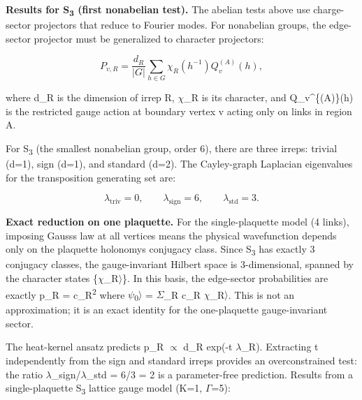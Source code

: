 \textbf{Results for S\textsubscript{3} (first nonabelian test).} The abelian tests above use charge-sector projectors that reduce to Fourier modes. For nonabelian groups, the edge-sector projector must be generalized to character projectors:

\[
P_{v,R} = \frac{d_R}{|G|} \sum_{h \in G} \chi_R(h^{-1}) Q_v^{(A)}(h),
\]

where d\_R is the dimension of irrep R, \ensuremath{\chi}\_R is its character, and Q\_v\^{}\{(A)\}(h) is the restricted gauge action at boundary vertex v acting only on links in region A.

For S\textsubscript{3} (the smallest nonabelian group, order 6), there are three irreps: trivial (d=1), sign (d=1), and standard (d=2). The Cayley-graph Laplacian eigenvalues for the transposition generating set are:

\[
\lambda_{\mathrm{triv}} = 0, \qquad \lambda_{\mathrm{sign}} = 6, \qquad
\lambda_{\mathrm{std}} = 3.
\]

\textbf{Exact reduction on one plaquette.} For the single-plaquette model (4 links), imposing Gauss\textquotesingle s law at all vertices means the physical wavefunction depends only on the plaquette holonomy\textquotesingle s conjugacy class. Since S\textsubscript{3} has exactly 3 conjugacy classes, the gauge-invariant Hilbert space is 3-dimensional, spanned by the character states \{\textbar \ensuremath{\chi}\_R\ensuremath{\rangle}\}. In this basis, the edge-sector probabilities are exactly p\_R = \textbar c\_R\textbar\textsuperscript{2} where \textbar \ensuremath{\psi}\textsubscript{0}\ensuremath{\rangle} = \ensuremath{\Sigma}\_R c\_R \textbar \ensuremath{\chi}\_R\ensuremath{\rangle}. This is not an approximation; it is an exact identity for the one-plaquette gauge-invariant sector.

The heat-kernel ansatz predicts p\_R \ensuremath{\propto} d\_R exp(-t \ensuremath{\lambda}\_R). Extracting t independently from the sign and standard irreps provides an overconstrained test: the ratio \ensuremath{\lambda}\_sign/\ensuremath{\lambda}\_std = 6/3 = 2 is a parameter-free prediction. Results from a single-plaquette S\textsubscript{3} lattice gauge model (K=1, \ensuremath{\Gamma}=5):

